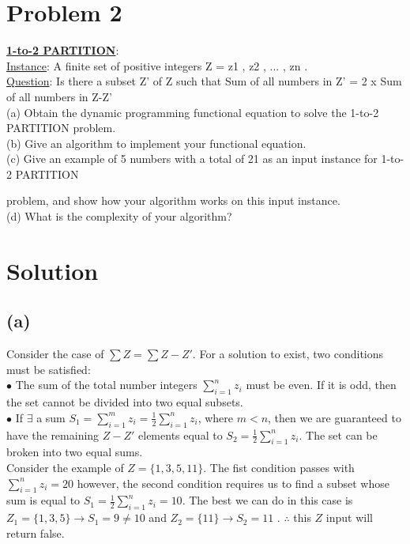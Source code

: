 
\section*{Problem 2}
    \textbf{\underline{1-to-2 PARTITION}}:\\
    \underline{Instance}: A finite set of positive integers Z = { z1 , z2 , ... , zn }.\\
    \underline{Question}: Is there a subset Z' of Z such that
    Sum of all numbers in Z' = 2 x Sum of all numbers in Z-Z'\\
    
    \noindent
    (a) Obtain the dynamic programming functional equation to solve the 1-to-2 PARTITION problem.\\
    (b) Give an algorithm to implement your functional equation.\\
    (c) Give an example of 5 numbers with a total of 21 as an input instance for 1-to-2 PARTITION
    
     problem, and show how your algorithm works on this input instance.\\
    (d) What is the complexity of your algorithm?
\section*{Solution}
	\subsection*{(a)}
		Consider the case of $\sum Z = \sum Z-Z'$. 
		For a solution to exist, two conditions must be satisfied:\\
		$\bullet$ The sum of the total number integers $\sum_{i=1}^{n} z_i$ must be even. 
		If it is odd, then the set cannot be divided into two equal subsets. \\
		$\bullet$ If $\exists$ a sum $S_1 = \sum_{i=1}^{m} z_i = \frac{1}{2}\sum_{i=1}^{n} z_i $, where $m < n$, then we are guaranteed to have the remaining $Z-Z'$ elements equal to $S_2 = \frac{1}{2}\sum_{i=1}^{n} z_i$. 
		The set can be broken into two equal sums.\\
		
		\noindent
		Consider the example of $Z = \{1,3,5,11\}$. 
		The fist condition passes with $\sum_{i=1}^{n} z_i = 20$  however, the second condition requires us to find a subset whose sum is equal to $S_1 = \frac{1}{2}\sum_{i=1}^{n} z_i = 10$. 
		The best we can do in this case is $Z_1 = \{1,3,5\}\rightarrow S_1 = 9\neq 10$ and $Z_2 = \{11\}\rightarrow S_2 = 11$ . 
		$\therefore$ this $Z$ input will return false.\\

